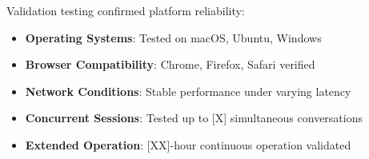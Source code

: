 \documentclass[11pt,letterpaper]{article}
\begin{document}
Validation testing confirmed platform reliability:

\begin{itemize}
    \item \textbf{Operating Systems}: Tested on macOS, Ubuntu, Windows
    \item \textbf{Browser Compatibility}: Chrome, Firefox, Safari verified
    \item \textbf{Network Conditions}: Stable performance under varying latency
    \item \textbf{Concurrent Sessions}: Tested up to [X] simultaneous conversations
    \item \textbf{Extended Operation}: [XX]-hour continuous operation validated
\end{itemize}
\end{document}
